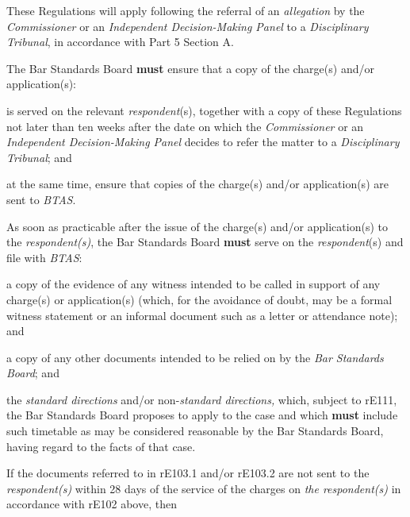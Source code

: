 These Regulations will apply following the referral of
an \emph{allegation} by the \emph{Commissioner }or an\emph{ Independent
Decision-Making Panel} to a \emph{Disciplinary Tribunal}, in accordance
with Part 5 Section A.\\
\par
{}
The Bar Standards Board  \textcolor{myred}{\textbf{must}} ensure that a copy of the charge(s) and/or
application(s):\\\nl \item is served on the relevant \emph{respondent}(s), together with a copy
of these Regulations not later than ten weeks after the date on which
the \emph{Commissioner} or an \emph{Independent Decision-Making
Panel} decides to refer the matter to a \emph{Disciplinary Tribunal};
and\item at the same time, ensure that copies of the charge(s) and/or
application(s) are sent to \emph{BTAS}.\ln
{}\par
{}
As soon as practicable after the issue of the charge(s) and/or
application(s) to the \emph{respondent(s)}, the Bar Standards Board  \textcolor{myred}{\textbf{must}}
serve on the \emph{respondent}(s) and file with \emph{BTAS}:\\\nl \item a copy of the evidence of any witness intended to be called in
support of any charge(s) or application(s) (which, for the avoidance of
doubt, may be a formal witness statement or an informal document such as
a letter or attendance note); and\item a copy of any other documents intended to be relied on by
the \emph{Bar Standards Board}; and\item the \emph{standard directions} and/or non-\emph{standard
directions,} which, subject to rE111, the Bar Standards Board proposes
to apply to the case and which  \textcolor{myred}{\textbf{must}} include such timetable as may be
considered reasonable by the Bar Standards Board, having regard to the
facts of that case.\ln
\hspace*{0.333em}\par
If the\emph{ }documents referred to in rE103.1 and/or rE103.2 are not
sent to the \emph{respondent(s)} within 28 days of the service of the
charges on \emph{the respondent(s) }in accordance with rE102 above, then
